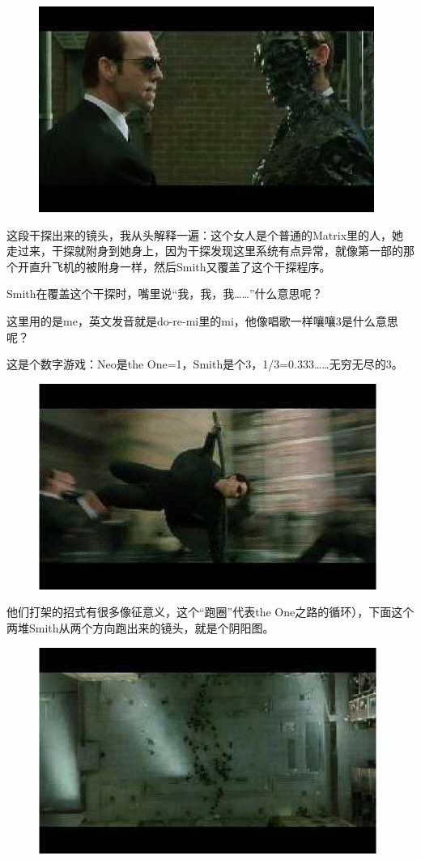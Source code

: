\documentclass{ctexart}
\begin{document}
\begin{figure}[htb]
\centering
\includegraphics[width=0.5\linewidth]{fig/read_reloaded-75-1}
\end{figure}

这段干探出来的镜头，我从头解释一遍：这个女人是个普通的Matrix里的人，她走过来，干探就附身到她身上，因为干探发现这里系统有点异常，就像第一部的那个开直升飞机的被附身一样，然后Smith又覆盖了这个干探程序。

Smith在覆盖这个干探时，嘴里说“我，我，我……”什么意思呢？

这里用的是me，英文发音就是do-re-mi里的mi，他像唱歌一样嚷嚷3是什么意思呢？

这是个数字游戏：Neo是the One=1，Smith是个3，1/3=0.333……无穷无尽的3。

\newpage

\begin{figure}[htb]
\centering
\includegraphics[width=0.5\linewidth]{fig/read_reloaded-77}
\end{figure}

他们打架的招式有很多像征意义，这个“跑圈”代表the One之路的循环），下面这个两堆Smith从两个方向跑出来的镜头，就是个阴阳图。

\begin{figure}[htb]
\centering
\includegraphics[width=0.5\linewidth]{fig/read_reloaded-78}
\end{figure}
\end{document}
